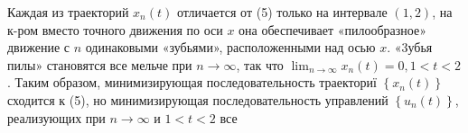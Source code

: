 \documentclass[10pt]{article}
\begin{document}
Каждая из траекторий $x_{n}(t)$ отличается от (5) только на интервале $(1,2)$, на к-ром вместо точного движения по оси $x$ она обеспечивает «пилообразное» движение с $n$ одинаковыми «зубьями», расположенными над осью $x$. «3убья пилы» становятся все мельче при $n \rightarrow \infty$, так что $\lim _{n \rightarrow \infty} x_{n}(t)=0,1<t<2$. Таким образом, минимизирующая последовательность траекториї $\left\{x_{n}(t)\right\}$ сходится к (5), но минимизирующая последовательность управлений $\left\{u_{n}(t)\right\}$, реализующих при $n \rightarrow \infty$ и $1<t<2$ все
\end{document}

